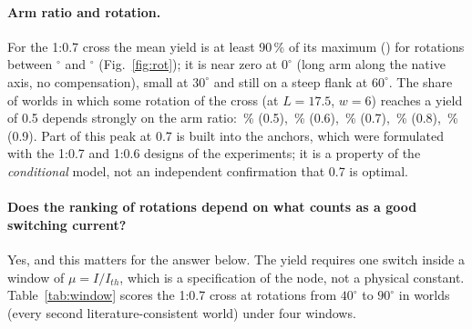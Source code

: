 \paragraph{Arm ratio and rotation.} For the 1:0.7 cross the mean yield is at least 90\,\% of its maximum (\meanYieldSevenMax) for rotations between \plateauLo$^\circ$ and \plateauHi$^\circ$ (Fig.~\ref{fig:rot}); it is near zero at $0^\circ$ (long arm along the native axis, no compensation), small at $30^\circ$ and still on a steep flank at $60^\circ$.
The share of worlds in which some rotation of the cross (at $L=17.5$, $w=6$) reaches a yield of 0.5 depends strongly on the arm ratio: \reachRatioFive\,\% (0.5), \reachRatioSix\,\% (0.6), \reachRatioSeven\,\% (0.7), \reachRatioEight\,\% (0.8), \reachRatioNine\,\% (0.9).
Part of this peak at 0.7 is built into the anchors, which were formulated with the 1:0.7 and 1:0.6 designs of the experiments; it is a property of the \emph{conditional} model, not an independent confirmation that 0.7 is optimal.
\begin{table}[H]\centering\small\tabTopSeven
\caption{Among the seven designs of \cite{yuan2025apl126}: the share of worlds in which each is the best one (ties broken toward the smaller index). In \noWorkingSeven\,\% of the worlds none of the seven is a working device.}\label{tab:top7}\end{table}
\paragraph{Does the ranking of rotations depend on what counts as a good switching current?} Yes, and this matters for the answer below. The yield requires one switch inside a window of $\mu=I/I_{th}$, which is a specification of the node, not a physical constant.
Table~\ref{tab:window} scores the 1:0.7 cross at rotations from $40^\circ$ to $90^\circ$ in \nWindowWorlds{} worlds (every second literature-consistent world) under four windows.
\begin{table}[H]\centering\small\tabWindow
\caption{Mean yield of the 1:0.7 cross ($L=17.5$, $w=6\,\mu$m, $\rho=0.5$) at rotations from the native axis, for four switching-current windows (default 1.25--1.95; low bias 1.15--1.60; wide 1.15--2.05; narrow 1.50--1.70), and the share of worlds in which the $60^\circ$ device beats the $90^\circ$ one and vice versa (ties excluded).}\label{tab:window}\end{table}

